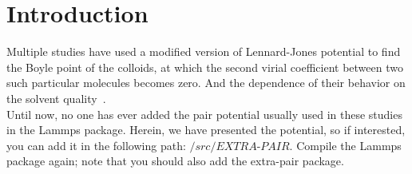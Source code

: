 \section{Introduction}
Multiple studies have used a modified version of Lennard-Jones potential to find the Boyle point of the colloids, at which the second virial coefficient between two such particular molecules becomes zero. And the dependence of their behavior on the solvent quality~\cite{Huissmann2009, Zahra, Narros2013}.
\\
Until now, no one has ever added the pair potential usually used in these studies in the Lammps package. Herein, we have presented the potential, so if interested, you can add it in the following path: $\textit{/src/EXTRA-PAIR}$.
Compile the Lammps package again; note that you should also add the extra-pair package.


